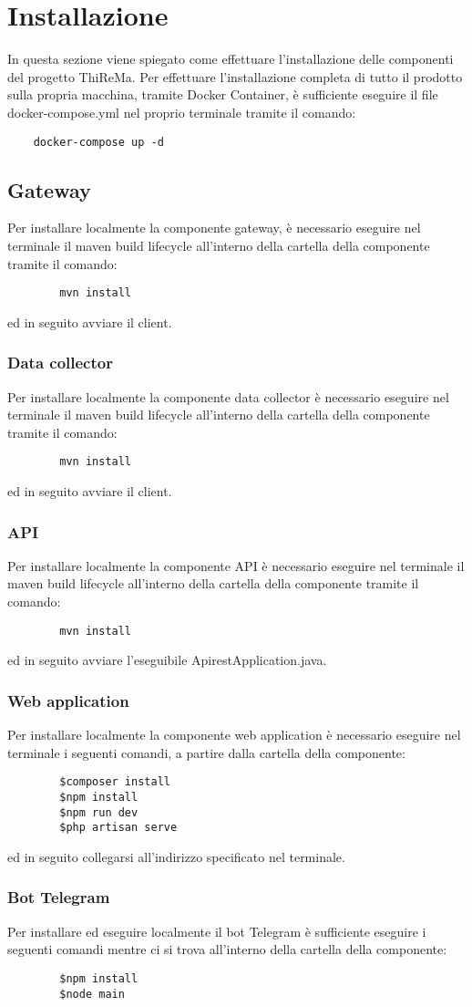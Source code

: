 \section{Installazione}
	In questa sezione viene spiegato come effettuare l'installazione delle componenti del progetto ThiReMa.
	\newline
	Per effettuare l'installazione completa di tutto il prodotto sulla propria macchina, tramite Docker Container, è sufficiente eseguire il file docker-compose.yml nel proprio terminale tramite il comando:
	\begin{verbatim}
	docker-compose up -d
	\end{verbatim}

	\subsection{Gateway}
		Per installare localmente la componente gateway, è necessario eseguire nel terminale il maven build lifecycle all'interno della cartella della componente tramite il comando:
		\begin{verbatim}
		mvn install
		\end{verbatim}
		ed in seguito avviare il client.

	\subsubsection{Data collector}
		Per installare localmente la componente data collector è necessario eseguire nel terminale il maven build lifecycle all'interno della cartella della componente tramite il comando:
		\begin{verbatim}
		mvn install
		\end{verbatim}
		ed in seguito avviare il client.

	\subsubsection{API}
		Per installare localmente la componente API è necessario eseguire nel terminale il maven build lifecycle all'interno della cartella della componente tramite il comando:
		\begin{verbatim}
		mvn install
		\end{verbatim}
		ed in seguito avviare l'eseguibile ApirestApplication.java.

	\subsubsection{Web application}
		Per installare localmente la componente web application è necessario eseguire nel terminale i seguenti comandi, a partire dalla cartella della componente:
		\begin{verbatim}
		$composer install
		$npm install
		$npm run dev
		$php artisan serve
		\end{verbatim}
		ed in seguito collegarsi all'indirizzo specificato nel terminale.
	\subsubsection{Bot Telegram}
		Per installare ed eseguire localmente il bot Telegram è sufficiente eseguire i seguenti comandi mentre ci si trova all'interno della cartella della componente:
		\begin{verbatim}
		$npm install
		$node main
		\end{verbatim}
		
